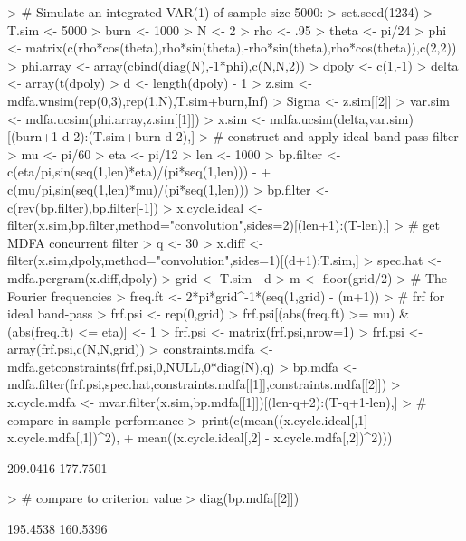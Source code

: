 \documentclass[a4paper]{book}
\begin{document}
\begin{Schunk}
\begin{Sinput}
> # Simulate an integrated VAR(1) of sample size 5000:
> set.seed(1234)
> T.sim <- 5000
> burn <- 1000
> N <- 2
> rho <- .95
> theta <- pi/24
> phi <- matrix(c(rho*cos(theta),rho*sin(theta),-rho*sin(theta),rho*cos(theta)),c(2,2))
> phi.array <- array(cbind(diag(N),-1*phi),c(N,N,2))
> dpoly <- c(1,-1)
> delta <- array(t(dpoly) %
> d <- length(dpoly) - 1
> z.sim <- mdfa.wnsim(rep(0,3),rep(1,N),T.sim+burn,Inf)
> Sigma <- z.sim[[2]]
> var.sim <- mdfa.ucsim(phi.array,z.sim[[1]])
> x.sim <- mdfa.ucsim(delta,var.sim)[(burn+1-d-2):(T.sim+burn-d-2),]
> # construct and apply ideal band-pass filter
> mu <- pi/60
> eta <- pi/12
> len <- 1000
> bp.filter <- c(eta/pi,sin(seq(1,len)*eta)/(pi*seq(1,len))) - 
+   c(mu/pi,sin(seq(1,len)*mu)/(pi*seq(1,len)))
> bp.filter <- c(rev(bp.filter),bp.filter[-1])
> x.cycle.ideal <- filter(x.sim,bp.filter,method="convolution",sides=2)[(len+1):(T-len),]
> # get MDFA concurrent filter
> q <- 30
> x.diff <- filter(x.sim,dpoly,method="convolution",sides=1)[(d+1):T.sim,]
> spec.hat <- mdfa.pergram(x.diff,dpoly)
> grid <- T.sim - d
> m <- floor(grid/2)
> # The Fourier frequencies
> freq.ft <- 2*pi*grid^{-1}*(seq(1,grid) - (m+1))
> # frf for ideal band-pass
> frf.psi <- rep(0,grid)
> frf.psi[(abs(freq.ft) >= mu) & (abs(freq.ft) <= eta)] <- 1
> frf.psi <- matrix(frf.psi,nrow=1) %
> frf.psi <- array(frf.psi,c(N,N,grid))
> constraints.mdfa <- mdfa.getconstraints(frf.psi,0,NULL,0*diag(N),q)
> bp.mdfa <- mdfa.filter(frf.psi,spec.hat,constraints.mdfa[[1]],constraints.mdfa[[2]])
> x.cycle.mdfa <- mvar.filter(x.sim,bp.mdfa[[1]])[(len-q+2):(T-q+1-len),]
> # compare in-sample performance
> print(c(mean((x.cycle.ideal[,1] - x.cycle.mdfa[,1])^2),
+ 	mean((x.cycle.ideal[,2] - x.cycle.mdfa[,2])^2)))
\end{Sinput}
\begin{Soutput}
[1] 209.0416 177.7501
\end{Soutput}
\begin{Sinput}
> # compare to criterion value
> diag(bp.mdfa[[2]])
\end{Sinput}
\begin{Soutput}
[1] 195.4538 160.5396
\end{Soutput}
\end{Schunk}
 
\end{document}
